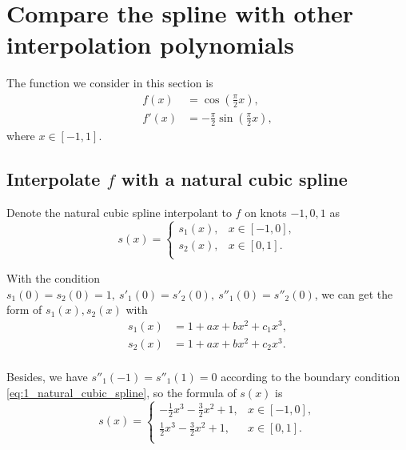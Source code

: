 \documentclass[a4paper]{article}
\begin{document}
\section{Compare the spline with other interpolation polynomials}

The function we consider in this section is 
\begin{equation}
  \begin{aligned}
    f(x) &= \cos (\frac{\pi}{2}x), \\
    f'(x) &= -\frac{\pi}{2}\sin(\frac{\pi}{2}x),
  \end{aligned}
  \label{eq:4_problem}
\end{equation}
where $x \in [-1, 1]$.

\subsection{Interpolate $f$ with a natural cubic spline}

Denote the natural cubic spline interpolant to $f$ on knots $-1, 0, 1$ as 
\begin{equation}
  s(x) = \begin{cases}
    s_1(x),& x \in [-1, 0], \\
    s_2(x),& x \in [0, 1]. \\
  \end{cases}
  \label{eq:4_natural_cubic_spline}
\end{equation}

With the condition $s_1(0) = s_2(0) = 1,\ s'_1(0) = s'_2(0),\ s''_1(0) = s''_2(0)$, we can get the form of $s_1(x), s_2(x)$ with
\begin{equation}
  \begin{aligned}
    s_1(x) &= 1 + ax + bx^2 + c_1x^3, \\
    s_2(x) &= 1 + ax + bx^2 + c_2x^3. \\
  \end{aligned}
  \label{eq:4_natural_cubic_spline_coefficients}
\end{equation}

Besides, we have $s''_1(-1) = s''_1(1) = 0$ according to the boundary condition \cref{eq:1_natural_cubic_spline}, so the formula of $s(x)$ is 
\begin{equation}
  s(x) = \begin{cases}
    -\frac{1}{2} x^3 - \frac{3}{2} x^2 + 1,& x \in [-1, 0], \\
    \frac{1}{2} x^3 - \frac{3}{2} x^2 + 1,& x \in [0, 1]. \\
  \end{cases}
  \label{eq:4_natural_cubic_spline_solution}
\end{equation}
\end{document}
